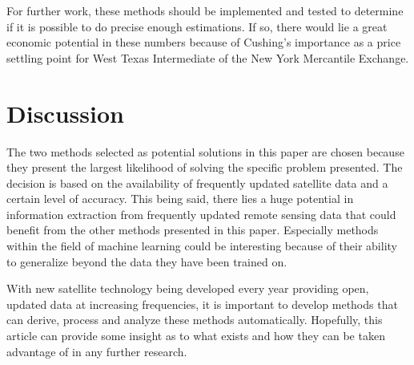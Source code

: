 For further work, these methods should be implemented and tested to determine if it is possible to do precise enough estimations. If so, there would lie a great economic potential in these numbers because of Cushing's importance as a price settling point for West Texas Intermediate of the New York Mercantile Exchange.

\section{Discussion}
The two methods selected as potential solutions in this paper are chosen because they present the largest likelihood of solving the specific problem presented. The decision is based on the availability of frequently updated satellite data and a certain level of accuracy. This being said, there lies a huge potential in information extraction from frequently updated remote sensing data that could benefit from the other methods presented in this paper. Especially methods within the field of machine learning could be interesting because of their ability to generalize beyond the data they have been trained on. 

With new satellite technology being developed every year providing open, updated data at increasing frequencies, it is important to develop methods that can derive, process and analyze these methods automatically. Hopefully, this article can provide some insight as to what exists and how they can be taken advantage of in any further research.